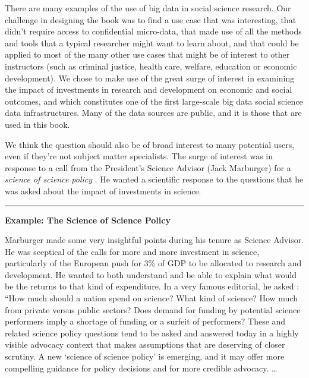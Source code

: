 \documentclass[]{krantz}
\begin{document}
There are many examples of the use of big data in social science
research. Our challenge in designing the book was to find a use case
that was interesting, that didn't require access to confidential
micro-data, that made use of all the methods and tools that a typical
researcher might want to learn about, and that could be applied to most
of the many other use cases that might be of interest to other
instructors (such as criminal justice, health care, welfare, education
or economic development). We chose to make use of the great surge of
interest in examining the impact of investments in research and
development on economic and social outcomes, and which constitutes one
of the first large-scale big data social science data infrastructures.
Many of the data sources are public, and it is those that are used in
this book.

We think the question should also be of broad interest to many potential
users, even if they're not subject matter specialists. The surge of
interest was in response to a call from the President's Science Advisor
(Jack Marburger) for a \emph{science of science policy}
\citep{marburger2005wanted}. He wanted a scientific response to the
questions that he was asked about the impact of investments in science.

\begin{center}\rule{0.5\linewidth}{\linethickness}\end{center}

\textbf{Example: The Science of Science Policy}

Marburger made some very insightful points during his tenure as Science
Advisor. He was sceptical of the calls for more and more investment in
science, particularly of the European push for 3\% of GDP to be
allocated to research and development. He wanted to both understand and
be able to explain what would be the returns to that kind of
expenditure. In a very famous editorial, he asked
\citep{marburger2005wanted}: ``How much should a nation spend on
science? What kind of science? How much from private versus public
sectors? Does demand for funding by potential science performers imply a
shortage of funding or a surfeit of performers? These and related
science policy questions tend to be asked and answered today in a highly
visible advocacy context that makes assumptions that are deserving of
closer scrutiny. A new `science of science policy' is emerging, and it
may offer more compelling guidance for policy decisions and for more
credible advocacy. \ldots{}
\end{document}

